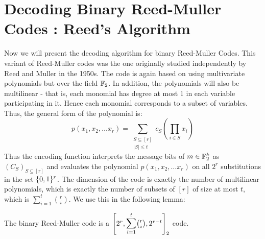 \section{Decoding Binary Reed-Muller Codes : Reed's Algorithm}

Now we will present the decoding algorithm for binary Reed-Muller Codes. This variant of Reed-Muller codes was the one originally studied independently by Reed and Muller in the 1950s. The code is again based on using multivariate polynomials but over the field ${\mathbb{F}}_2$. In addition, the polynomials will also be multilinear - that is, each monomial has degree at most $1$ in each variable participating in it. Hence each monomial corresponds to a subset of variables. Thus, the general form of the polynomial is:
$$ p(x_1, x_2, \ldots x_r) = \sum_{\substack{S \subseteq [r]\\ |S| \le t}} c_S \left( \prod_{i \in S} x_i \right)$$
Thus the encoding function interprets the message bits of $m \in {\mathbb{F}}_2^k$ as $\left(C_S\right)_{S\subseteq [r]}$ and evaluates the polynomial $p(x_1, x_2, \ldots x_r)$ on all $2^r$ substitutions in the set $\{0,1\}^r$. The dimension of the code is exactly the number of multilinear polynomials, which is exactly the number of subsets of $[r]$ of size at most $t$, which is $\sum_{i=1}^t {r \choose i}$. We use this in the following lemma:
\begin{lemma}
The binary Reed-Muller code is a 
$\left[2^r,\bigsum_{i=1}^t {r \choose i},2^{r-t}\right]_2$ code.
\end{lemma}
